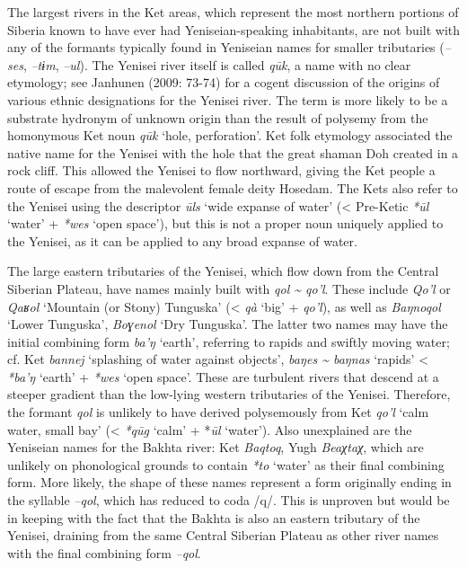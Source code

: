 The largest rivers in the Ket areas, which represent the most northern portions of Siberia known to have ever had Yeniseian-speaking inhabitants, are not built with any of the formants typically found in Yeniseian names for smaller tributaries (\textit{–ses}, \textit{–tɨm}, \textit{–ul}). The Yenisei river itself is called \textit{q\=uk}, a name with no clear etymology; see Janhunen (2009: 73-74) for a cogent discussion of the origins of various ethnic designations for the Yenisei river. The term is more likely to be a substrate hydronym of unknown origin than the result of polysemy from the homonymous Ket noun \textit{q\=uk} ‘hole, perforation’. Ket folk etymology associated the native name for the Yenisei with the hole that the great shaman Doh created in a rock cliff. This allowed the Yenisei to flow northward, giving the Ket people a route of escape from the malevolent female deity Hosedam. The Kets also refer to the Yenisei using the descriptor \textit{\=uls }‘wide expanse of water’ ({\textless} Pre-Ketic \textit{*\=ul} ‘water’ + \textit{*wes} ‘open space’), but this is not a proper noun uniquely applied to the Yenisei, as it can be applied to any broad expanse of water.

The large eastern tributaries of the Yenisei, which flow down from the Central Siberian Plateau, have names mainly built with \textit{qol \~{} qo’l}. These include \textit{Qo’l} or \textit{Qaʁol }‘Mountain (or Stony) Tunguska’ ({\textless} \textit{qà }‘big’ + \textit{qo’l}), as well as \textit{Baŋnoqol} ‘Lower Tunguska’, \textit{Boɣenol} ‘Dry Tunguska’. The latter two names may have the initial combining form \textit{ba’ŋ }‘earth’, referring to rapids and swiftly moving water; cf. Ket \textit{bannej} ‘splashing of water against objects’, \textit{baŋes \~{} baŋnas }‘rapids’ {\textless} \textit{*ba’ŋ} ‘earth’ + \textit{*wes} ‘open space’. These are turbulent rivers that descend at a steeper gradient than the low-lying western tributaries of the Yenisei. Therefore, the formant \textit{qol} is unlikely to have derived polysemously from Ket \textit{qo’l }‘calm water, small bay’ ({\textless} \textit{*q\={u}g}\textbf{\textit{ }}‘calm’ + *\textit{\={u}l} ‘water’). Also unexplained are the Yeniseian names for the Bakhta river: Ket \textit{Baqtoq}, Yugh \textit{Beaχtaχ}, which are unlikely on phonological grounds to contain \textit{*to} ‘water’ as their final combining form. More likely, the shape of these names represent a form originally ending in the syllable \textit{–qol}, which has reduced to coda /q/. This is unproven but would be in keeping with the fact that the Bakhta is also an eastern tributary of the Yenisei, draining from the same Central Siberian Plateau as other river names with the final combining form \textit{–qol}.

